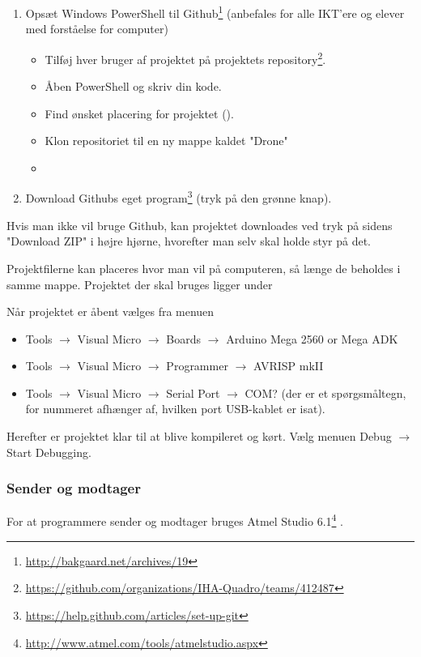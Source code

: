 \documentclass[Main]{subfiles}
\begin{document}
\begin{enumerate}
\item Opsæt Windows PowerShell til Github\footnote{\url{http://bakgaard.net/archives/19}} (anbefales for alle IKT'ere og elever med forståelse for computer)
	\begin{itemize}
	\item Tilføj hver bruger af projektet på projektets repository\footnote{\url{https://github.com/organizations/IHA-Quadro/teams/412487}}.
	\item Åben PowerShell og skriv din kode.
	\item Find ønsket placering for projektet ().
	\item Klon repositoriet til en ny mappe kaldet "Drone" 
	\item[] 
	\end{itemize}
\item Download Githubs eget program\footnote{\url{https://help.github.com/articles/set-up-git}} (tryk på den grønne knap).
\end{enumerate}

Hvis man ikke vil bruge Github, kan projektet downloades ved tryk på sidens "Download ZIP" i højre hjørne, hvorefter man selv skal holde styr på det.

Projektfilerne kan placeres hvor man vil på computeren, så længe de beholdes i samme mappe.
Projektet der skal bruges ligger under 

Når projektet er åbent vælges fra menuen 
\begin{itemize}
\item Tools $\rightarrow$ Visual Micro $\rightarrow$ Boards $\rightarrow$ Arduino Mega 2560 or Mega ADK
\item Tools $\rightarrow$ Visual Micro $\rightarrow$ Programmer $\rightarrow$ AVRISP mkII
\item Tools $\rightarrow$ Visual Micro $\rightarrow$ Serial Port $\rightarrow$ COM? (der er et spørgsmåltegn, for nummeret afhænger af, hvilken port USB-kablet er isat).
\end{itemize}

Herefter er projektet klar til at blive kompileret og kørt.
Vælg menuen Debug $\rightarrow$ Start Debugging.




\subsubsection{Sender og modtager}
For at programmere sender og modtager bruges Atmel Studio 6.1\footnote{\url{http://www.atmel.com/tools/atmelstudio.aspx}} .
\end{document}

